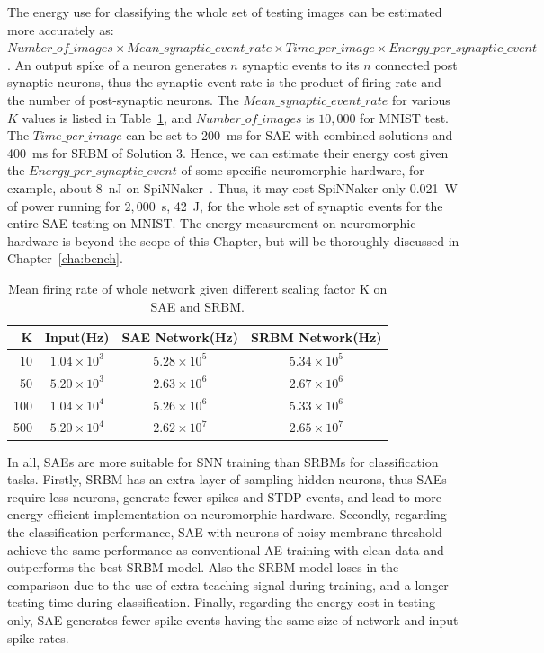 The energy use for classifying the whole set of testing images can be estimated more accurately as: $Number\_of\_images \times Mean\_synaptic\_event\_rate \times Time\_per\_image \times Energy\_per\_synaptic\_event$.
An output spike of a neuron generates $n$ synaptic events to its $n$ connected post synaptic neurons, thus the synaptic event rate is the product of firing rate and the number of post-synaptic neurons.
The $Mean\_synaptic\_event\_rate$ for various $K$ values is listed in Table~\ref{tbl:fire_rate}, and $Number\_of\_images$ is $10,000$ for MNIST test.
The $Time\_per\_image$ can be set to 200~ms for SAE with combined solutions and 400~ms for SRBM of Solution 3.
Hence, we can estimate their energy cost given the $Energy\_per\_synaptic\_event$ of some specific neuromorphic hardware, for example, about 8~nJ on SpiNNaker~\cite{stromatias2013power}.
Thus, it may cost SpiNNaker only 0.021~W of power running for $2,000$~s, 42~J, for the whole set of synaptic events for the entire SAE testing on MNIST.
The energy measurement on neuromorphic hardware is beyond the scope of this Chapter, but will be thoroughly discussed in Chapter~\ref{cha:bench}.
\begin{table}[htbp]
	\centering
	\caption{\label{tbl:fire_rate}Mean firing rate of whole network given different scaling factor K on SAE and SRBM.}
	\bgroup
	\def\arraystretch{1.4}
	\begin{tabular}{r c c c}
		K & Input(Hz) & SAE Network(Hz) & SRBM Network(Hz)\\
		\hline
		10 & $1.04 \times 10^3$ & $5.28 \times 10^5$ & $5.34 \times 10^5$ \\
		50 & $5.20 \times 10^3$ & $2.63 \times 10^6$ & $2.67 \times 10^6$ \\
		100 & $1.04 \times 10^4$ & $5.26 \times 10^6$ & $5.33 \times 10^6$ \\
		500 & $5.20 \times 10^4$ & $2.62 \times 10^7$ & $2.65 \times 10^7$ \\
	\end{tabular}
	\egroup
\end{table}

In all, SAEs are more suitable for SNN training than SRBMs for classification tasks.
Firstly, SRBM has an extra layer of sampling hidden neurons, thus SAEs require less neurons, generate fewer spikes and STDP events, and lead to more energy-efficient implementation on neuromorphic hardware.
Secondly, regarding the classification performance, SAE with neurons of noisy membrane threshold achieve the same performance as conventional AE training with clean data and outperforms the best SRBM model.
Also the SRBM model loses in the comparison due to the use of extra teaching signal during training, and a longer testing time during classification.
Finally, regarding the energy cost in testing only, SAE generates fewer spike events having the same size of network and input spike rates.

